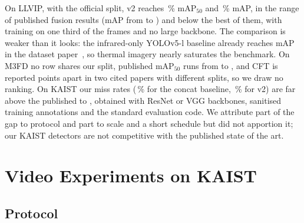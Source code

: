 

On LLVIP, with the official split, v2 reaches \resLlvipCffmVtwoMeanMapFifty{}\,\% mAP$_{50}$ and \resLlvipCffmVtwoMeanMap{}\,\% mAP, in the range of published fusion results (mAP from \sotaLlvipFusionMapMin{} to \sotaLlvipFusionMapMax{}) and below the best of them, with training on one third of the frames and no large backbone. The comparison is weaker than it looks: the infrared-only YOLOv5-l baseline already reaches \sotaLlvipIrOnlyMap{} mAP in the dataset paper~\cite{jia2021llvip}, so thermal imagery nearly saturates the benchmark. On M3FD no row shares our split, published mAP$_{50}$ runs from \sotaMfdMapFiftyMin{} to \sotaMfdMapFiftyMax{}, and CFT is reported \sotaMfdSplitSwing{} points apart in two cited papers with different splits, so we draw no ranking. On KAIST our miss rates (\kstConcatAllMr{}\,\% for the concat baseline, \kstCffmAllMr{}\,\% for v2) are far above the published \sotaKaistMrMin{} to \sotaKaistMrMax{}, obtained with ResNet or VGG backbones, sanitised training annotations and the standard evaluation code. We attribute part of the gap to protocol and part to scale and a short schedule but did not apportion it; our KAIST detectors are not competitive with the published state of the art.

\section{Video Experiments on KAIST}
\label{sec:video}
\subsection{Protocol}
\label{sec:kaistprotocol}


